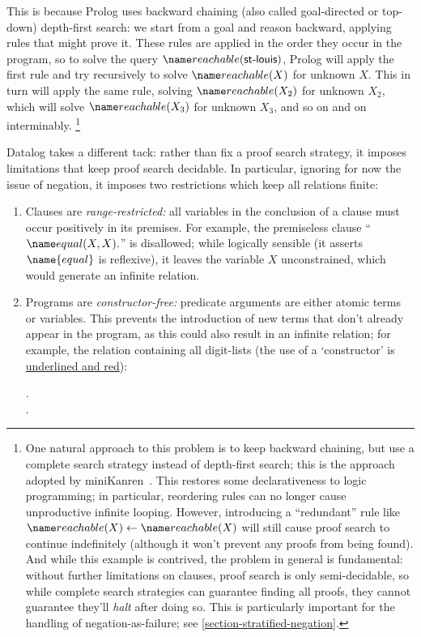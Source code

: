 This is because Prolog uses backward chaining (also called goal-directed or
top-down) depth-first search: we start from a goal and reason backward, applying
rules that might prove it.
%
These rules are applied in the order they occur in the program, so to solve the
query $\atom{reachable}{\datum{st-louis}}$, Prolog will apply the
first rule and try recursively to solve $\atom{reachable}{X}$ for
unknown $X$.
%
This in turn will apply the same rule, solving $\atom{reachable}{X_2}$ for unknown $X_2$, which will solve $\atom{reachable}{X_3}$
for unknown $X_3$, and so on and on interminably.%
%
\footnote{One natural approach to this problem is to keep backward chaining, but
  use a complete search strategy instead of depth-first search; this is the
  approach adopted by miniKanren~\citep{kanren}. This restores some
  declarativeness to logic programming; in particular, reordering rules can no
  longer cause unproductive infinite looping. However, introducing a
  ``redundant'' rule like $\atom{reachable}{X} \gets \atom{reachable}{X}$ will
  still cause proof search to continue indefinitely (although it won't prevent
  any proofs from being found). And while this example is contrived, the problem
  in general is fundamental: without further limitations on clauses, proof
  search is only semi-decidable, so while complete search strategies can
  guarantee finding all proofs, they cannot guarantee they'll \emph{halt} after
  doing so. This is particularly important for the handling of
  negation-as-failure; see \cref{section-stratified-negation}.}

Datalog takes a different tack: rather than fix a proof search strategy, it
imposes limitations that keep proof search decidable. In particular, ignoring
for now the issue of negation, it imposes two restrictions which keep all
relations finite:

\begin{enumerate}
\item Clauses are \emph{range-restricted:} all variables in the conclusion of a
  clause must occur positively in its premises. For example, the premiseless
  clause ``$\atom{equal}{X,X}.$'' is disallowed; while logically sensible (it
  asserts $\name{equal}$ is reflexive), it leaves the variable $X$
  unconstrained, which would generate an infinite relation.

\item Programs are \emph{constructor-free:} predicate arguments are either
  atomic terms or variables. This prevents the introduction of new terms that
  don't already appear in the program, as this could also result in an infinite
  relation; for example, the relation containing all digit-lists (the use of a
  `constructor' is {\color{Red}\underline{underlined and red}}):

  \begin{datalog}
    .
    \\
     \gets
     \conj {}.
  \end{datalog}
\end{enumerate}

